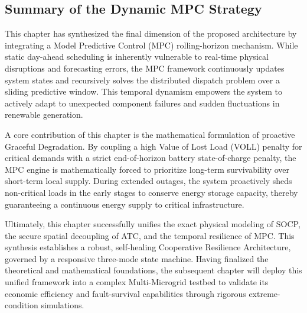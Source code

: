 \subsection{Summary of the Dynamic MPC Strategy}

This chapter has synthesized the final dimension of the proposed architecture by integrating a Model Predictive Control (MPC) rolling-horizon mechanism. While static day-ahead scheduling is inherently vulnerable to real-time physical disruptions and forecasting errors, the MPC framework continuously updates system states and recursively solves the distributed dispatch problem over a sliding predictive window. This temporal dynamism empowers the system to actively adapt to unexpected component failures and sudden fluctuations in renewable generation.

A core contribution of this chapter is the mathematical formulation of proactive Graceful Degradation. By coupling a high Value of Lost Load (VOLL) penalty for critical demands with a strict end-of-horizon battery state-of-charge penalty, the MPC engine is mathematically forced to prioritize long-term survivability over short-term local supply. During extended outages, the system proactively sheds non-critical loads in the early stages to conserve energy storage capacity, thereby guaranteeing a continuous energy supply to critical infrastructure.

Ultimately, this chapter successfully unifies the exact physical modeling of SOCP, the secure spatial decoupling of ATC, and the temporal resilience of MPC. This synthesis establishes a robust, self-healing Cooperative Resilience Architecture, governed by a responsive three-mode state machine. Having finalized the theoretical and mathematical foundations, the subsequent chapter will deploy this unified framework into a complex Multi-Microgrid testbed to validate its economic efficiency and fault-survival capabilities through rigorous extreme-condition simulations.
